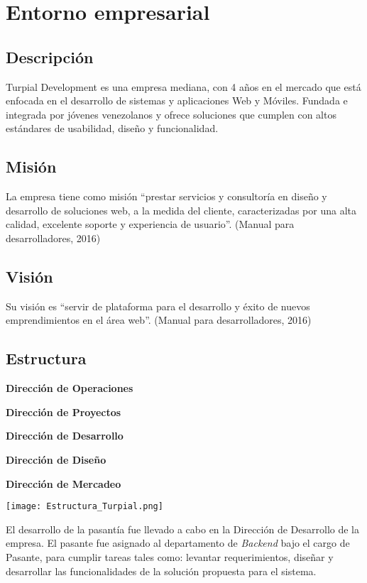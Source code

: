 \chapter{\textbf{Entorno empresarial}}

\thispagestyle{empty}

\section{Descripción}

Turpial Development es una empresa mediana, con 4 años en el mercado que está enfocada en el desarrollo de sistemas y aplicaciones Web y Móviles. Fundada e integrada por jóvenes venezolanos y ofrece soluciones que cumplen con altos estándares de usabilidad, diseño y funcionalidad.

\section{Misión}

La empresa tiene como misión “prestar servicios y consultoría en diseño y desarrollo de soluciones web, a la medida del cliente, caracterizadas por una alta calidad, excelente soporte y experiencia de usuario”. (Manual para desarrolladores, 2016)


\section{Visión}

Su visión es “servir de plataforma para el desarrollo y éxito de nuevos emprendimientos en el área web”. (Manual para desarrolladores, 2016)

\section{Estructura}

\begin{description}
    \item \textbf{Dirección de Operaciones}
    \item \textbf{Dirección de Proyectos}
    \item \textbf{Dirección de Desarrollo}
    \item \textbf{Dirección de Diseño}
    \item \textbf{Dirección de Mercadeo}
\end{description}

\texttt{[image: Estructura\_Turpial.png]}

El desarrollo de la pasantía fue llevado a cabo en la Dirección de Desarrollo de la empresa. El pasante fue asignado al departamento de \textit{Backend} bajo el cargo de Pasante, para cumplir tareas tales como: levantar requerimientos, diseñar y desarrollar las funcionalidades de la solución propuesta para el sistema. 



